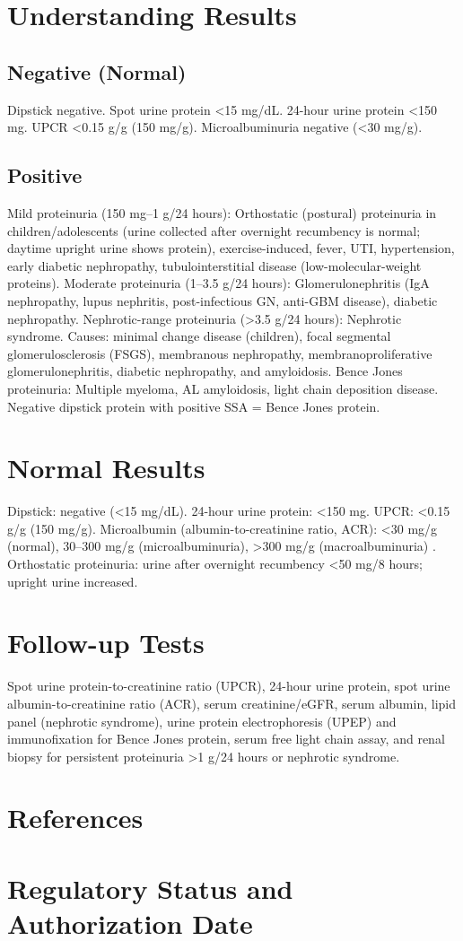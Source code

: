 \section*{Understanding Results}
\subsection*{Negative (Normal)}
Dipstick negative. Spot urine protein <15 mg/dL. 24-hour urine protein <150 mg. UPCR <0.15 g/g (150 mg/g). Microalbuminuria negative (<30 mg/g).
\subsection*{Positive}
Mild proteinuria (150 mg--1 g/24 hours): Orthostatic (postural) proteinuria in children/adolescents (urine collected after overnight recumbency is normal; daytime upright urine shows protein), exercise-induced, fever, UTI, hypertension, early diabetic nephropathy, tubulointerstitial disease (low-molecular-weight proteins). Moderate proteinuria (1--3.5 g/24 hours): Glomerulonephritis (IgA nephropathy, lupus nephritis, post-infectious GN, anti-GBM disease), diabetic nephropathy. Nephrotic-range proteinuria (>3.5 g/24 hours): Nephrotic syndrome. Causes: minimal change disease (children), focal segmental glomerulosclerosis (FSGS), membranous nephropathy, membranoproliferative glomerulonephritis, diabetic nephropathy, and amyloidosis. Bence Jones proteinuria: Multiple myeloma, AL amyloidosis, light chain deposition disease. Negative dipstick protein with positive SSA = Bence Jones protein.
\section*{Normal Results}
Dipstick: negative (<15 mg/dL). 24-hour urine protein: <150 mg. UPCR: <0.15 g/g (150 mg/g). Microalbumin (albumin-to-creatinine ratio, ACR): <30 mg/g (normal), 30--300 mg/g (microalbuminuria), >300 mg/g (macroalbuminuria) \cite{kdigo2012clinical}. Orthostatic proteinuria: urine after overnight recumbency <50 mg/8 hours; upright urine increased.
\section*{Follow-up Tests}
Spot urine protein-to-creatinine ratio (UPCR), 24-hour urine protein, spot urine albumin-to-creatinine ratio (ACR), serum creatinine/eGFR, serum albumin, lipid panel (nephrotic syndrome), urine protein electrophoresis (UPEP) and immunofixation for Bence Jones protein, serum free light chain assay, and renal biopsy for persistent proteinuria >1 g/24 hours or nephrotic syndrome.
\section*{References}



\clearpage
\section*{Regulatory Status and Authorization Date}

\clearpage
